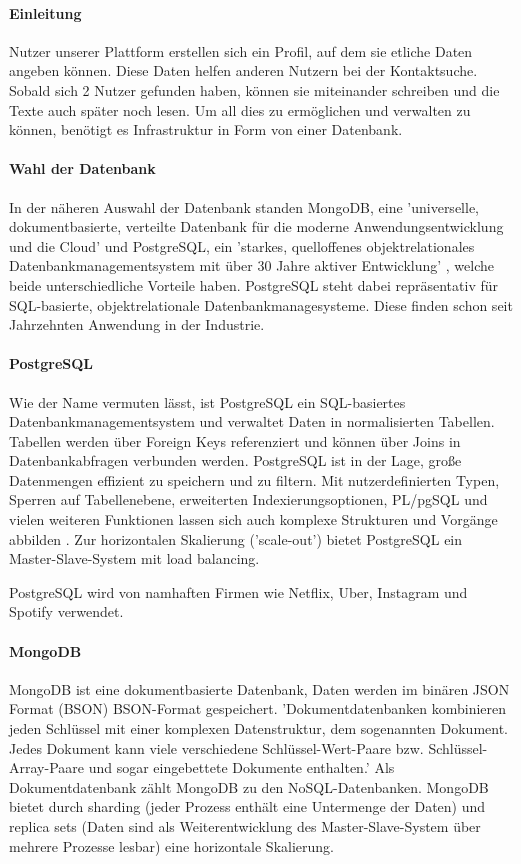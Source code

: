 \paragraph{Einleitung}
Nutzer unserer Plattform erstellen sich ein Profil, auf dem sie etliche Daten angeben können. Diese Daten helfen anderen Nutzern bei der Kontaktsuche. Sobald sich 2 Nutzer gefunden haben, können sie miteinander schreiben und die Texte auch später noch lesen. Um all dies zu ermöglichen und verwalten zu können, benötigt es Infrastruktur in Form von einer Datenbank.

\paragraph{Wahl der Datenbank}
In der näheren Auswahl der Datenbank standen MongoDB, eine 'universelle, dokumentbasierte, verteilte Datenbank für die moderne Anwendungsentwicklung und die Cloud' \cite{MG1} und PostgreSQL, ein 'starkes, quelloffenes objektrelationales Datenbankmanagementsystem mit über 30 Jahre aktiver Entwicklung' \cite{PG01}, welche beide unterschiedliche Vorteile haben. PostgreSQL steht dabei repräsentativ für SQL-basierte, objektrelationale Datenbankmanagesysteme. Diese finden schon seit Jahrzehnten Anwendung in der Industrie.


\paragraph{PostgreSQL}
Wie der Name vermuten lässt, ist PostgreSQL ein SQL-basiertes Datenbankmanagementsystem und verwaltet Daten in normalisierten Tabellen. Tabellen werden über Foreign Keys referenziert und können über Joins in Datenbankabfragen verbunden werden. PostgreSQL ist in der Lage, große Datenmengen effizient zu speichern und zu filtern. Mit nutzerdefinierten Typen, Sperren auf Tabellenebene, erweiterten Indexierungsoptionen, PL/pgSQL und vielen weiteren Funktionen lassen sich auch komplexe Strukturen und Vorgänge abbilden \cite{PG02}. Zur horizontalen Skalierung ('scale-out') bietet PostgreSQL ein Master-Slave-System mit load balancing. \cite{PG11}

PostgreSQL wird von namhaften Firmen wie Netflix, Uber, Instagram und Spotify verwendet. \cite{PG03}

\paragraph{MongoDB}
MongoDB ist eine dokumentbasierte Datenbank, Daten werden im binären JSON Format (BSON) BSON-Format gespeichert. 'Dokumentdatenbanken kombinieren jeden Schlüssel mit einer komplexen Datenstruktur, dem sogenannten Dokument. Jedes Dokument kann viele verschiedene Schlüssel-Wert-Paare bzw. Schlüssel-Array-Paare und sogar eingebettete Dokumente enthalten.' \cite{MG2} Als Dokumentdatenbank zählt MongoDB zu den NoSQL-Datenbanken. MongoDB bietet durch sharding (jeder Prozess enthält eine Untermenge der Daten) und replica sets (Daten sind als Weiterentwicklung des Master-Slave-System über mehrere Prozesse lesbar) eine horizontale Skalierung.

